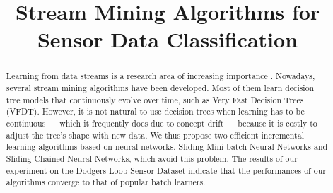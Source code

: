 \documentclass[conference]{IEEEtran}
\begin{document}
	\title{Stream Mining Algorithms for Sensor Data Classification}

	
	\author{
	\and
	\and
	}

	
		\maketitle
		
		\begin{abstract}
			Learning from data streams is a research area of increasing importance \cite{evaluation_stream_mining}. Nowadays, several stream mining algorithms have been developed. Most of them learn decision tree models that continuously evolve over time, such as Very Fast Decision Trees (VFDT). However, it is not natural to use decision trees when learning has to be continuous --- which it frequently does due to concept drift --- because it is costly to adjust the tree's shape with new data. We thus propose two efficient incremental learning algorithms based on neural networks, Sliding Mini-batch Neural Networks and Sliding Chained Neural Networks, which avoid this problem. The results of our experiment on the Dodgers Loop Sensor Dataset indicate that the performances of our algorithms converge to that of popular batch learners.

		\end{abstract}
\end{document}
